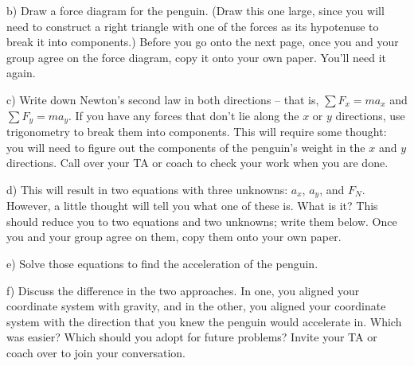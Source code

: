 \documentclass[12pt]{article}
\begin{document}
b) Draw a force diagram for the penguin. (Draw this one large, since you will need to construct a right triangle 
with one of the forces as its hypotenuse to break it into components.) Before you go onto the next page, once you and your group agree on the force diagram, copy it onto your own paper. You'll need it again.


\newpage

c) Write down Newton's second law in both directions -- that is, $\sum F_x = ma_x$ and $\sum F_y = ma_y$. 
If you have any forces that don't lie along the $x$ or $y$ directions, use trigonometry to break them into components.
This will require some thought: you will need to figure out the components of the 
penguin's weight in the $x$ and $y$ directions. Call over your TA or coach to check your work when you are done.

\vspace{3in}


d) This will result in two equations with three unknowns: $a_x$, $a_y$, and $F_N$. However, a little thought will
tell you what one of these is. What is it? This should reduce you to two equations and two unknowns; write them below. Once you and your group agree on them, copy them onto your own paper.

\vspace{2in}
\newpage
e) Solve those equations to find the acceleration of the penguin.

\vspace{2in}

f) Discuss the difference in the two approaches. In one, you aligned your coordinate system with gravity, and in the other, you aligned your coordinate system with the direction that you knew the penguin would accelerate in. Which was easier? Which 
should you adopt for future problems? Invite your TA or coach over to join your conversation.
\end{document}
